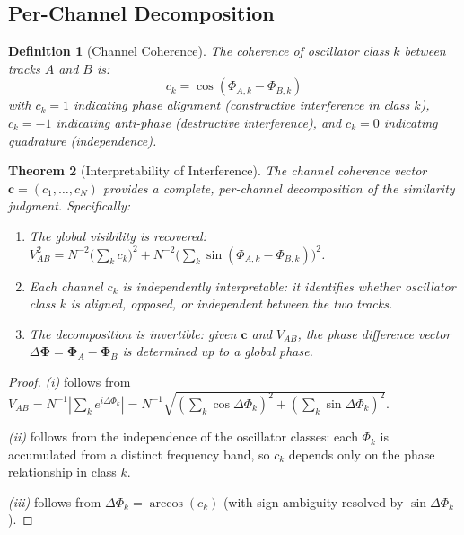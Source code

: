 \documentclass[11pt,twocolumn,a4paper]{article}
\newtheorem{theorem}{Theorem}[section]
\newtheorem{definition}[theorem]{Definition}
\newcommand{\Spec}{\bm{\Phi}}
\begin{document}
\subsection{Per-Channel Decomposition}

\begin{definition}[Channel Coherence]
\label{def:channel-coherence}
The coherence of oscillator class $k$ between tracks $A$ and $B$ is:
\begin{equation}
  c_k = \cos(\Phi_{A,k} - \Phi_{B,k})
  \label{eq:channel-coherence}
\end{equation}
with $c_k = 1$ indicating phase alignment (constructive interference
in class $k$), $c_k = -1$ indicating anti-phase (destructive
interference), and $c_k = 0$ indicating quadrature (independence).
\end{definition}

\begin{theorem}[Interpretability of Interference]
\label{thm:interpretability}
The channel coherence vector
$\mathbf{c} = (c_1, \ldots, c_N)$ provides a complete,
per-channel decomposition of the similarity judgment. Specifically:
\begin{enumerate}[label=(\roman*),leftmargin=*]
\item The global visibility is recovered: $V_{AB}^2 = N^{-2}
  \bigl(\sum_k c_k\bigr)^2 + N^{-2}\bigl(\sum_k
  \sin(\Phi_{A,k} - \Phi_{B,k})\bigr)^2$.
\item Each channel $c_k$ is independently interpretable: it identifies
  whether oscillator class $k$ is aligned, opposed, or independent
  between the two tracks.
\item The decomposition is invertible: given $\mathbf{c}$ and
  $V_{AB}$, the phase difference vector $\Delta\Spec = \Spec_A -
  \Spec_B$ is determined up to a global phase.
\end{enumerate}
\end{theorem}

\begin{proof}
\textit{(i)} follows from $V_{AB} = N^{-1}|\sum_k e^{i\Delta\Phi_k}|
= N^{-1}\sqrt{(\sum_k \cos\Delta\Phi_k)^2 + (\sum_k
\sin\Delta\Phi_k)^2}$.

\textit{(ii)} follows from the independence of the oscillator classes:
each $\Phi_k$ is accumulated from a distinct frequency band, so
$c_k$ depends only on the phase relationship in class $k$.

\textit{(iii)} follows from $\Delta\Phi_k = \arccos(c_k)$ (with sign
ambiguity resolved by $\sin\Delta\Phi_k$).
\end{proof}
\end{document}
